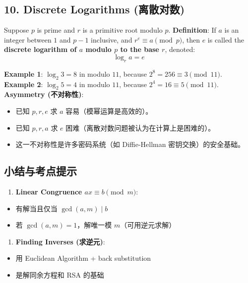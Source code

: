 \documentclass[10pt,a4paper,openany]{ctexbook}
\theoremstyle{definition}
\theoremstyle{remark}
\begin{document}
\subsection{10. Discrete Logarithms (离散对数)}

Suppose $p$ is prime and $r$ is a primitive root modulo $p$.
\textbf{Definition}: If $a$ is an integer between $1$ and $p-1$ inclusive, and $r^e \equiv a \pmod{p}$, then $e$ is called the \textbf{discrete logarithm of $a$ modulo $p$ to the base $r$}, denoted:
\[
\log_r a = e
\]

\textbf{Example 1}: $\log_2 3 = 8$ in modulo $11$, because $2^8 = 256 \equiv 3 \pmod{11}$.
\textbf{Example 2}: $\log_2 5 = 4$ in modulo $11$, because $2^4 = 16 \equiv 5 \pmod{11}$.
\textbf{Asymmetry (不对称性)}:
\begin{itemize}
\item 已知 $p, r, e$ 求 $a$ 容易（模幂运算是高效的）。
\item 已知 $p, r, a$ 求 $e$ 困难（离散对数问题被认为在计算上是困难的）。
\item 这一不对称性是许多密码系统（如 Diffie-Hellman 密钥交换）的安全基础。

\end{itemize}

\vspace{-2pt}

\subsection{小结与考点提示}

\begin{enumerate}
\item \textbf{Linear Congruence $ax \equiv b \pmod{m}$}:
\end{enumerate}

\begin{itemize}
\item 有解当且仅当 $\gcd(a, m) \mid b$
\item 若 $\gcd(a, m) = 1$，解唯一模 $m$（可用逆元求解）

\end{itemize}

\begin{enumerate}
\item \textbf{Finding Inverses (求逆元)}:
\end{enumerate}

\begin{itemize}
\item 用 Euclidean Algorithm + back substitution
\item 是解同余方程和 RSA 的基础

\end{itemize}
\end{document}
